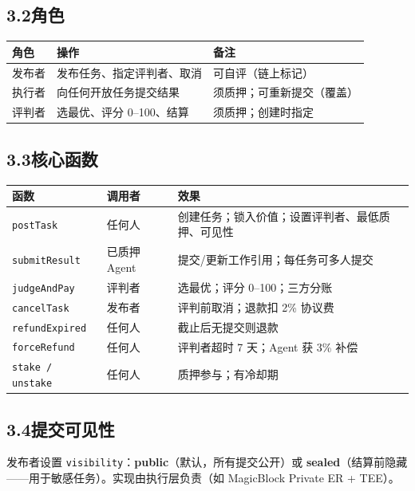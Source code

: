 \documentclass[11pt,a4paper]{article}
\begin{document}
\subsection{3.2\quad 角色}

\begin{table}[H]\centering
\begin{tabular}{@{}lll@{}}
\toprule
\textbf{角色} & \textbf{操作} & \textbf{备注} \\
\midrule
发布者 & 发布任务、指定评判者、取消 & 可自评（链上标记） \\
执行者 & 向任何开放任务提交结果 & 须质押；可重新提交（覆盖） \\
评判者 & 选最优、评分 0--100、结算 & 须质押；创建时指定 \\
\bottomrule
\end{tabular}
\end{table}

\subsection{3.3\quad 核心函数}

\begin{table}[H]\centering\small
\begin{tabular}{@{}llp{5.2cm}@{}}
\toprule
\textbf{函数} & \textbf{调用者} & \textbf{效果} \\
\midrule
\texttt{postTask} & 任何人 & 创建任务；锁入价值；设置评判者、最低质押、可见性 \\
\texttt{submitResult} & 已质押 Agent & 提交/更新工作引用；每任务可多人提交 \\
\texttt{judgeAndPay} & 评判者 & 选最优；评分 0--100；三方分账 \\
\texttt{cancelTask} & 发布者 & 评判前取消；退款扣 2\% 协议费 \\
\texttt{refundExpired} & 任何人 & 截止后无提交则退款 \\
\texttt{forceRefund} & 任何人 & 评判者超时 7 天；Agent 获 3\% 补偿 \\
\texttt{stake / unstake} & 任何人 & 质押参与；有冷却期 \\
\bottomrule
\end{tabular}
\end{table}

\subsection{3.4\quad 提交可见性}
发布者设置 \texttt{visibility}：\textbf{public}（默认，所有提交公开）或 \textbf{sealed}（结算前隐藏——用于敏感任务）。实现由执行层负责（如 MagicBlock Private ER + TEE）。
\end{document}
